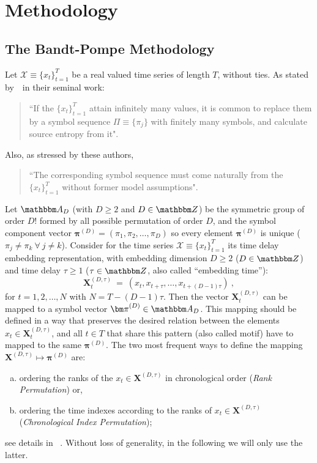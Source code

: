 \section{Methodology}\label{Sec:Method}

\subsection{The Bandt-Pompe Methodology}

Let ${\mathcal X} \equiv \{x_t\}_{t=1}^{T}$ be a real valued time series of length $T$, without ties. 
As stated
by~\citeauthor{Bandt2002Permutation}~\citeyear{Bandt2002Permutation}in their seminal work:  
\begin{quote}
``If the $\{x_t\}_{t=1}^{T}$ attain infinitely many values, it is common to replace them by a symbol sequence 
$\Pi \equiv \{\pi_j\}$ with finitely many symbols, and calculate source entropy from it".
\end{quote}
Also, as stressed by these authors, 
\begin{quote}
``The corresponding symbol sequence must come 
naturally from the $\{x_t\}_{t=1}^{T}$ without former model assumptions".
\end{quote}

Let ${\mathbbm A}_{D}$ (with $D \geq 2$ and $D \in {\mathbbm Z}$) be the symmetric group of order $D!$ formed by all 
possible permutation of order $D$, and the symbol component vector 
${\bm \pi}^{(D)} = (\pi_1, \pi_2, \dots, \pi_D)$ so every element ${\bm \pi}^{(D)}$ is unique 
($\pi_j \neq \pi_k~\forall~j \neq k$). 
Consider for the time series ${\mathcal X} \equiv \{x_t\}_{t=1}^{T}$ its time delay embedding representation,
with embedding dimension $D \geq 2$ ($D \in {\mathbbm Z}$) and time delay $\tau \geq 1$ ($\tau \in {\mathbbm Z}$, also called ``embedding time''):
\begin{equation} 
\label{eq:time-delay}
{\mathbf X}^{(D,\tau)}_t ~=~( x_t,x_{t+\tau},\dots,x_{t+(D-1)\tau} ) \ ,
\end{equation} 
for $t = 1,2,\dots,N$ with $N = T-(D-1) \tau$.
Then the vector ${\mathbf X}^{(D,\tau)}_t$ can be mapped to a symbol vector ${\bm \pi}^{(D)} \in {\mathbbm A}_{D}$. 
This mapping should be defined in a way that preserves the desired relation between the elements 
$x_t  \in {\mathbf X}^{(D,\tau)}_t$, and all $t \in T$ that share this pattern (also called motif) have to mapped to the same 
${\bm \pi}^{(D)}$. 
The two most frequent ways to define the mapping ${\mathbf X}^{(D,\tau)} \mapsto {\bm \pi}^{(D)}$ are:  
\begin{enumerate}[a)]
\item ordering the ranks of the $x_t \in {\mathbf X}^{(D,\tau)}$ in chronological order 
       (\textit{Rank Permutation}) or,
\item ordering the time indexes according to the ranks of $x_t \in {\mathbf X}^{(D,\tau)}$  
       (\textit{Chronological Index Permutation});
\end{enumerate}
       see details in \citeauthor{Traversaro2018Bandt}~.
Without loss of generality, in the following we will only use the latter.

